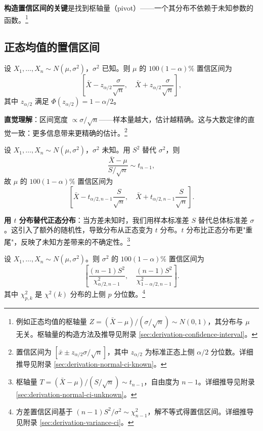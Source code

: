 \textbf{构造置信区间的关键}是找到枢轴量（pivot）——一个其分布不依赖于未知参数的函数。\footnote{例如正态均值的枢轴量 $Z = (\bar{X}-\mu)/(\sigma/\sqrt{n}) \sim N(0,1)$，其分布与 $\mu$ 无关。枢轴量的构造方法及推导见附录 \cref{sec:derivation-confidence-interval}。}

\subsection{正态均值的置信区间}

\begin{example}[已知方差]\label{ex:ci-normal-known}
设 $X_1, \ldots, X_n \sim N(\mu, \sigma^2)$，$\sigma^2$ 已知。则 $\mu$ 的 $100(1-\alpha)\%$ 置信区间为
\[
\left[ \bar{X} - z_{\alpha/2}\frac{\sigma}{\sqrt{n}},\quad \bar{X} + z_{\alpha/2}\frac{\sigma}{\sqrt{n}} \right],
\label{eq:ci-normal-known}\]
其中 $z_{\alpha/2}$ 满足 $\Phi(z_{\alpha/2}) = 1 - \alpha/2$。

\textbf{直觉理解}：区间宽度 $\propto \sigma/\sqrt{n}$——样本量越大，估计越精确。这与大数定律的直觉一致：更多信息带来更精确的估计。\footnote{置信区间为 $[\bar{x} \pm z_{\alpha/2}\sigma/\sqrt{n}]$，其中 $z_{\alpha/2}$ 为标准正态上侧 $\alpha/2$ 分位数。详细推导见附录 \cref{sec:derivation-normal-ci-known}。}
\end{example}

\begin{example}[未知方差]\label{ex:ci-normal-unknown}
设 $X_1, \ldots, X_n \sim N(\mu, \sigma^2)$，$\sigma^2$ 未知。用 $S^2$ 替代 $\sigma^2$，则
\[
\frac{\bar{X} - \mu}{S/\sqrt{n}} \sim t_{n-1},
\label{eq:t-statistic}\]
故 $\mu$ 的 $100(1-\alpha)\%$ 置信区间为
\[
\left[ \bar{X} - t_{\alpha/2,n-1}\frac{S}{\sqrt{n}},\quad \bar{X} + t_{\alpha/2,n-1}\frac{S}{\sqrt{n}} \right].
\label{eq:ci-normal-unknown}\]

\textbf{用 $t$ 分布替代正态分布}：当方差未知时，我们用样本标准差 $S$ 替代总体标准差 $\sigma$。这引入了额外的随机性，导致分布从正态变为 $t$ 分布。$t$ 分布比正态分布更"重尾"，反映了未知方差带来的不确定性。\footnote{枢轴量 $T = (\bar{X}-\mu)/(S/\sqrt{n}) \sim t_{n-1}$，自由度为 $n-1$。详细推导见附录 \cref{sec:derivation-normal-ci-unknown}。}
\end{example}

\begin{theorem}[方差置信区间]\label{th:ci-variance-ch4}
设 $X_1, \ldots, X_n \sim N(\mu, \sigma^2)$。则 $\sigma^2$ 的 $100(1-\alpha)\%$ 置信区间为
\[
\left[ \frac{(n-1)S^2}{\chi^2_{\alpha/2,n-1}},\quad \frac{(n-1)S^2}{\chi^2_{1-\alpha/2,n-1}} \right].
\label{eq:ci-variance}\]
其中 $\chi^2_{p, k}$ 是 $\chi^2(k)$ 分布的上侧 $p$ 分位数。\footnote{方差置信区间基于 $(n-1)S^2/\sigma^2 \sim \chi^2_{n-1}$，解不等式得置信区间。详细推导见附录 \cref{sec:derivation-variance-ci}。}
\end{theorem}

